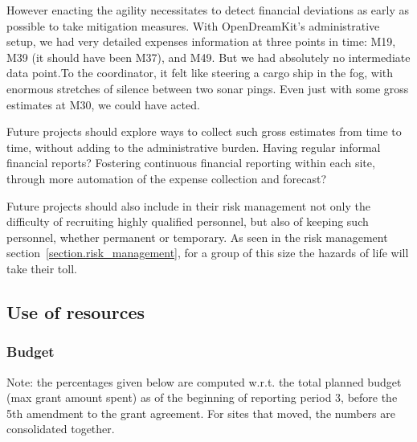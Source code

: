 However enacting the agility necessitates to detect financial
deviations as early as possible to take mitigation measures. With
OpenDreamKit's administrative setup, we had very detailed expenses
information at three points in time: M19, M39 (it should have been
M37), and M49. But we had absolutely no intermediate data point.To the  
coordinator, it felt like steering a cargo ship in the fog, with
enormous stretches of silence between two sonar pings. Even just with
some gross estimates at M30, we could have acted.

Future projects should explore ways to collect such gross estimates
from time to time, without adding to the administrative burden. Having
regular informal financial reports? Fostering continuous financial
reporting within each site, through more automation of the expense
collection and forecast?

Future projects should also include in their risk management not only
the difficulty of recruiting highly qualified personnel, but also of
keeping such personnel, whether permanent or temporary. As seen in the
risk management section~\ref{section.risk_management}, for a group of this size
the hazards of life will take their toll.

\subsection{Use of resources}

\subsubsection{Budget}

Note: the percentages given below are computed w.r.t. the total
planned budget (max grant amount spent) as of the beginning of
reporting period 3, before the 5th amendment to the grant agreement.
For sites that moved, the numbers are consolidated together.


